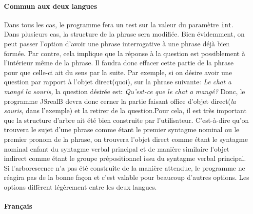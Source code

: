 \documentclass[11pt]{article} %
\newcommand{\system}[1]{\textsf{#1}}
\newcommand{\JSB}{\system{JSrealB}}
\newcommand{\real}[1]{\emph{#1}}
\begin{document}
\paragraph{Commun aux deux langues}

Dans tous les cas, le programme fera un test sur la valeur du paramètre
\texttt{int}. Dans plusieurs cas, la structure de la phrase sera modifiée.
Bien évidemment, on peut passer l'option d'avoir une phrase interrogative
à une phrase déjà bien formée. Par contre, cela implique que la réponse
à la question est possiblement à l'intérieur même de la phrase. Il
faudra donc effacer cette partie de la phrase pour que celle-ci ait
du sens par la suite. Par exemple, si on désire avoir une question
par rapport à l'objet direct(quoi), sur la phrase suivante: \emph{Le
chat a mangé la souris, }la question désirée est: \emph{Qu'est-ce
que le chat a mangé?} Donc, le programme \JSB{} devra donc cerner
la partie faisant office d'objet direct(\real{la souris}, dans l'exemple)
et la retirer de la question.Pour cela, il est très important que
la structure d'arbre ait été bien construite par l'utilisateur. C'est-à-dire
qu'on trouvera le sujet d'une phrase comme étant le premier syntagme
nominal ou le premier pronom de la phrase, on trouvera l'objet direct
comme étant le syntagme nominal enfant du syntagme verbal principal
et de manière similaire l'objet indirect comme étant le groupe prépositionnel
issu du syntagme verbal principal. Si l'arborescence n'a pas été construite
de la manière attendue, le programme ne réagira pas de la bonne façon
et c'est valable pour beaucoup d'autres options. Les options diffèrent
légèrement entre les deux langues.

\paragraph{Français}
\end{document}
